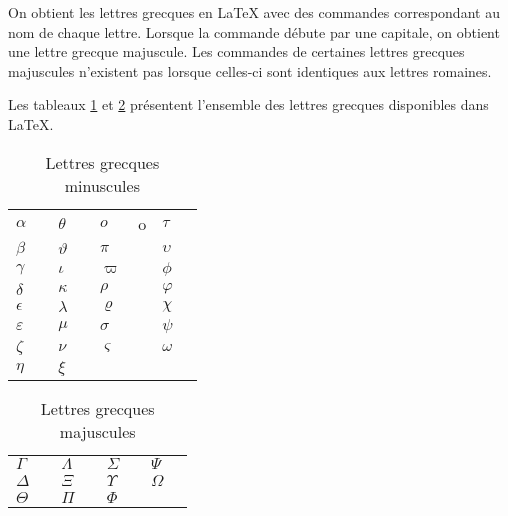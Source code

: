 On obtient les lettres grecques en {\LaTeX} avec des commandes
correspondant au nom de chaque lettre. Lorsque la commande débute par
une capitale, on obtient une lettre grecque majuscule. Les commandes
de certaines lettres grecques majuscules n'existent pas lorsque celles-ci
sont identiques aux lettres romaines.

Les tableaux \ref{tab:math:grecques} et \ref{tab:math:Grecques}
présentent l'ensemble des lettres grecques disponibles dans {\LaTeX}.

\begin{table}
  \caption{Lettres grecques minuscules}
  \label{tab:math:grecques}
  \begin{tabularx}{1.0\linewidth}{lXlXlXlX}
    $\alpha$      & \cmd{\alpha}      & $\theta$    & \cmd{\theta} &
    $o$           & o                 & $\tau$      & \cmd{\tau} \\
    $\beta$       & \cmd{\beta}       & $\vartheta$ & \cmd{\vartheta} &
    $\pi$         & \cmd{\pi}         & $\upsilon$  & \cmd{\upsilon} \\
    $\gamma$      & \cmd{\gamma}      & $\iota$     & \cmd{\iota} &
    $\varpi$      & \cmd{\varpi}      & $\phi$      & \cmd{\phi} \\
    $\delta$      & \cmd{\delta}      & $\kappa$    & \cmd{\kappa} &
    $\rho$        & \cmd{\rho}        & $\varphi$   & \cmd{\varphi} \\
    $\epsilon$    & \cmd{\epsilon}    & $\lambda$   & \cmd{\lambda} &
    $\varrho$     & \cmd{\varrho}     & $\chi$      & \cmd{\chi} \\
    $\varepsilon$ & \cmd{\varepsilon} & $\mu$       & \cmd{\mu} &
    $\sigma$      & \cmd{\sigma}      & $\psi$      & \cmd{\psi} \\
    $\zeta$       & \cmd{\zeta}       & $\nu$       & \cmd{\nu} &
    $\varsigma$   & \cmd{\varsigma}   & $\omega$    & \cmd{\omega} \\
    $\eta$        & \cmd{\eta}        & $\xi$       & \cmd{\xi}
  \end{tabularx}
\end{table}

\begin{table}
  \caption{Lettres grecques majuscules}
  \label{tab:math:Grecques}
  \begin{tabularx}{1.0\linewidth}{lXlXlXlX}
    $\Gamma$    & \cmd{\Gamma}   &
    $\Lambda$   & \cmd{\Lambda}  &
    $\Sigma$    & \cmd{\Sigma}   &
    $\Psi$      & \cmd{\Psi}     \\
    $\Delta$    & \cmd{\Delta}   &
    $\Xi$       & \cmd{\Xi}      &
    $\Upsilon$  & \cmd{\Upsilon} &
    $\Omega$    & \cmd{\Omega}   \\
    $\Theta$    & \cmd{\Theta}   &
    $\Pi$       & \cmd{\Pi}      &
    $\Phi$      & \cmd{\Phi}
  \end{tabularx}
\end{table}

